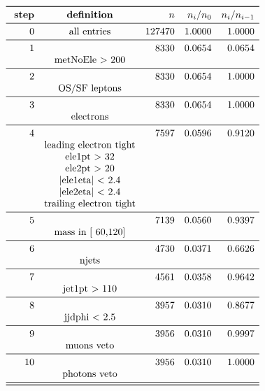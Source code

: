 \documentclass[11pt,a4paper]{article}
\begin{document}
\begin{table}
\caption{\emph{Entries after each selection step, normalised to 5.00 $fb^{-1}$; n is the number of entries after the i-th selection step; Note that cuts on second jet are applied only if a second jet exists with $p_t$ > 30\,GeV.}}
\[
\begin{array}{rcrrr}
\toprule
\ \textbf{step}& \textbf{definition}  & n  &  n_i/n_0 & n_i/n_{i-1}  \\ 
\midrule
 0  & \text{all entries} & 127470 & 1.0000 & 1.0000 \\
\midrule
 1  & &   8330 & 0.0654 & 0.0654 \\
& \text{metNoEle > 200} & & & \\
\midrule
 2  & &   8330 & 0.0654 & 1.0000 \\
& \text{OS/SF leptons} & & & \\
\midrule
 3  & &   8330 & 0.0654 & 1.0000 \\
& \text{electrons} & & & \\
\midrule
 4  & &   7597 & 0.0596 & 0.9120 \\
& \text{leading electron tight} & & & \\
& \text{ele1pt >  32} & & & \\
& \text{ele2pt >  20} & & & \\
& \text{|ele1eta| < 2.4} & & & \\
& \text{|ele2eta| < 2.4} & & & \\
& \text{trailing electron tight} & & & \\
\midrule
 5  & &   7139 & 0.0560 & 0.9397 \\
& \text{mass in [ 60,120]} & & & \\
\midrule
 6  & &   4730 & 0.0371 & 0.6626 \\
& \text{njets} & & & \\
\midrule
 7  & &   4561 & 0.0358 & 0.9642 \\
& \text{jet1pt >  110} & & & \\
\midrule
 8  & &   3957 & 0.0310 & 0.8677 \\
& \text{jjdphi < 2.5} & & & \\
\midrule
 9  & &   3956 & 0.0310 & 0.9997 \\
& \text{muons veto} & & & \\
\midrule
 10  & &   3956 & 0.0310 & 1.0000 \\
& \text{photons veto} & & & \\
\midrule
\bottomrule
\end{array}
\]
\end{table}
\end{document}
